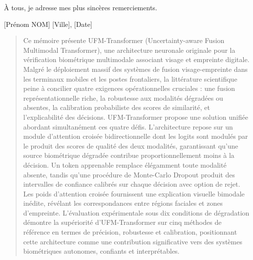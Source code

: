 \documentclass[12pt,a4paper]{report}
\begin{document}
\`{A} tous, je adresse mes plus sinc\`{e}res remerciements.

\vspace{1cm}
\hfill [Pr\'{e}nom NOM]
\hfill [Ville], [Date]

\begin{abstract}
Ce m\'{e}moire pr\'{e}sente UFM-Transformer (Uncertainty-aware Fusion Multimodal Transformer), une architecture neuronale originale pour la v\'{e}rification biom\'{e}trique multimodale associant visage et empreinte digitale. Malgr\'{e} le d\'{e}ploiement massif des syst\`{e}mes de fusion visage-empreinte dans les terminaux mobiles et les postes frontaliers, la litt\'{e}rature scientifique peine \`{a} concilier quatre exigences op\'{e}rationnelles cruciales : une fusion repr\'{e}sentationnelle riche, la robustesse aux modalit\'{e}s d\'{e}grad\'{e}es ou absentes, la calibration probabiliste des scores de similarit\'{e}, et l'explicabilit\'{e} des d\'{e}cisions. UFM-Transformer propose une solution unifi\'{e}e abordant simultan\'{e}ment ces quatre d\'{e}fis. L'architecture repose sur un module d'attention crois\'{e}e bidirectionnelle dont les logits sont modul\'{e}s par le produit des scores de qualit\'{e} des deux modalit\'{e}s, garantissant qu'une source biom\'{e}trique d\'{e}grad\'{e}e contribue proportionnellement moins \`{a} la d\'{e}cision. Un token apprenable remplace \'{e}l\'{e}gamment toute modalit\'{e} absente, tandis qu'une proc\'{e}dure de Monte-Carlo Dropout produit des intervalles de confiance calibr\'{e}s sur chaque d\'{e}cision avec option de rejet. Les poids d'attention crois\'{e}e fournissent une explication visuelle bimodale in\'{e}dite, r\'{e}v\'{e}lant les correspondances entre r\'{e}gions faciales et zones d'empreinte. L'\'{e}valuation exp\'{e}rimentale sous dix conditions de d\'{e}gradation d\'{e}montre la sup\'{e}riorit\'{e} d'UFM-Transformer sur cinq m\'{e}thodes de r\'{e}f\'{e}rence en termes de pr\'{e}cision, robustesse et calibration, positionnant cette architecture comme une contribution significative vers des syst\`{e}mes biom\'{e}triques autonomes, confiants et interpr\'{e}tables.
\end{abstract}
\end{document}
